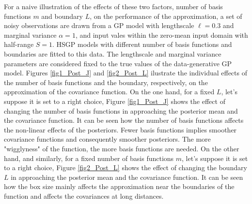\documentclass[]{interact}
\theoremstyle{plain}%
\theoremstyle{definition}
\theoremstyle{remark}
\begin{document}
For a naive illustration of the effects of these two factors, number of basis functions $m$ and boundary $L$, on the performance of the approximation, a set of noisy observations are drawn from a GP model with lengthscale $\ell=0.3$ and marginal variance $\alpha=1$, and input vales within the zero-mean input domain with half-range $S=1$. HSGP models with different number of basis functions and boundaries are fitted to this data. The lengthscale and marginal variance parameters are considered fixed to the true values of the data-generative GP model. Figures \ref{fig1_Post_J} and \ref{fig2_Post_L} ilustrate the individual effects of the number of basis functions and the boundary, respectively, on the approximation of the covariance function. On the one hand, for a fixed $L$, let's suppose it is set to a right choice, Figure \ref{fig1_Post_J} shows the effect of changing the number of basis functions in approaching the posterior mean and the covariance function. It can be seen how the number of basis functions affects the non-linear effects of the posteriors. Fewer basis functions implies smoother covariance functions and consequently smoother posteriors. The more "wigglyness" of the function, the more basis functions are needed. On the other hand, and similarly, for a fixed number of basis functions $m$, let's suppose it is set to a right choice, Figure \ref{fig2_Post_L} shows the effect of changing the boundary $L$ in approaching the posterior mean and the covariance function. It can be seen how the box size mainly affects the approximation near the boundaries of the function and affects the covariances at long distances. \\
\end{document}
